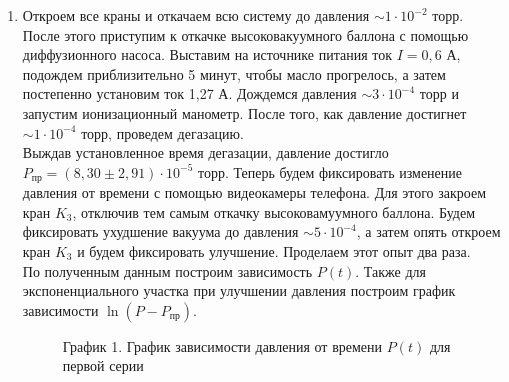 \documentclass[a4paper]{article}
\begin{document}
\begin{enumerate}
\item Откроем все краны и откачаем всю систему до давления $\sim 1\cdot 10^{-2}$ торр. После этого приступим к откачке высоковакуумного баллона с помощью диффузионного насоса. Выставим на источнике питания ток $I = 0,6$ А, подождем приблизительно 5 минут, чтобы масло прогрелось, а затем постепенно установим ток 1,27 А. Дождемся давления  $\sim 3\cdot 10^{-4}$ торр и запустим ионизационный манометр. После того, как давление достигнет $\sim 1\cdot 10^{-4}$ торр, проведем дегазацию.\\
	Выждав установленное время дегазации, давление достигло $P_{\text{пр}} = (8,30 \pm 2,91)  \cdot 10^{-5}$ торр. Теперь будем фиксировать изменение давления от времени с помощью видеокамеры телефона. Для этого закроем кран $K_3$, отключив тем самым откачку высоковамуумного баллона. Будем фиксировать ухудшение вакуума до давления $\sim 5\cdot 10^{-4}$, а затем опять откроем кран $K_3$ и будем фиксировать улучшение. Проделаем этот опыт два раза.\\
	По полученным данным построим зависимость $P(t)$. Также для экспоненциального участка при улучшении давления построим график зависимости $\ln(P - P_{\text{пр}})$.
\begin{figure}[h!]
\caption[]{\label{} График 1. График зависимости давления от времени $P(t)$ для первой серии}
\end{figure}
\begin{figure}[h!]

\end{figure}
\end{enumerate}
\end{document}
